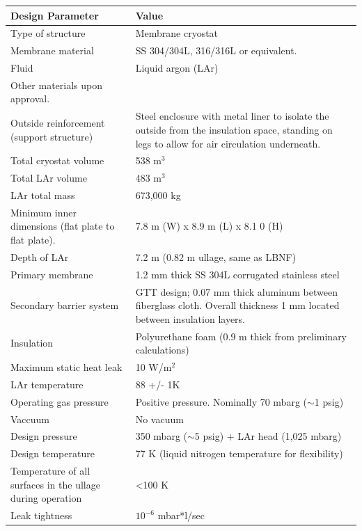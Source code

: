 \begin{table}[htpb]
\centering
\begin{tabular}{|p{}|p{}|}
\hline
\textbf{Design Parameter} & \textbf{Value} \\ \hline
Type of structure & Membrane cryostat \\ \hline
Membrane material    &  SS 304/304L, 316/316L or equivalent. \\ \hline
Fluid & Liquid argon (LAr)  \\ \hline
Other materials upon approval.\\ \hline
 Outside reinforcement (support structure)  &  Steel enclosure with metal liner to isolate the outside from the insulation space, standing on legs to allow for air circulation underneath. \\ \hline
 Total cryostat volume  &  538 m$^3$ \\ \hline
 Total LAr volume  &  483 m$^3$ \\ \hline
LAr total mass   & 673,000 kg  \\ \hline
Minimum inner dimensions (flat plate to flat plate).   &  7.8 m (W) x 8.9 m (L) x 8.1 0 (H) \\ \hline
Depth of LAr   &  7.2 m (0.82 m ullage, same as LBNF) \\ \hline
Primary membrane   &   1.2 mm thick SS 304L corrugated stainless steel\\ \hline
Secondary barrier system   &  GTT design; 0.07 mm thick aluminum between fiberglass cloth. Overall thickness 1 mm located between insulation layers.  \\ \hline
 Insulation  &  Polyurethane foam (0.9 m thick from preliminary calculations) \\ \hline
Maximum static heat leak   &  10 W/m$^2$ \\ \hline
LAr temperature   & 88 +/- 1K  \\ \hline
Operating gas pressure   &  Positive pressure. Nominally 70 mbarg ($\sim$1 psig) \\ \hline
 Vaccuum  &  No vacuum \\ \hline
 Design pressure  &  350 mbarg ($\sim$5 psig) + LAr head (1,025 mbarg) \\ \hline
Design temperature   &  77 K (liquid nitrogen temperature for flexibility) \\ \hline
Temperature of all surfaces in the ullage during operation   & \textless 100 K  \\ \hline
Leak tightness   & $10^{-6}$ mbar*l/sec   \\ \hline

\end{tabular}
\end{table}
